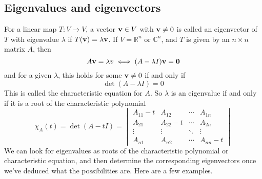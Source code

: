 \subsection{Eigenvalues and eigenvectors}
For a linear map \(T\colon V \to V\), a vector \(\vb v \in V\) with \(\vb v \neq 0\) is called an eigenvector of \(T\) with eigenvalue \(\lambda\) if \(T(\vb v) = \lambda \vb v\).
If \(V = \mathbb R^n\) or \(\mathbb C^n\), and \(T\) is given by an \(n \times n\) matrix \(A\), then
\[
	A\vb v = \lambda v \iff (A - \lambda I)\vb v = \vb 0
\]
and for a given \(\lambda\), this holds for some \(\vb v \neq 0\) if and only if
\[
	\det(A - \lambda I) = 0
\]
This is called the characteristic equation for \(A\).
So \(\lambda\) is an eigenvalue if and only if it is a root of the characteristic polynomial
\[
	\chi_A(t) = \det(A - tI) = \begin{vmatrix}
		A_{11} - t & A_{12}     & \cdots & A_{1n}     \\
		A_{21}     & A_{22} - t & \cdots & A_{2n}     \\
		\vdots     & \vdots     & \ddots & \vdots     \\
		A_{n1}     & A_{n2}     & \cdots & A_{nn} - t
	\end{vmatrix}
\]
We can look for eigenvalues as roots of the characteristic polynomial or characteristic equation, and then determine the corresponding eigenvectors once we've deduced what the possibilities are.
Here are a few examples.
